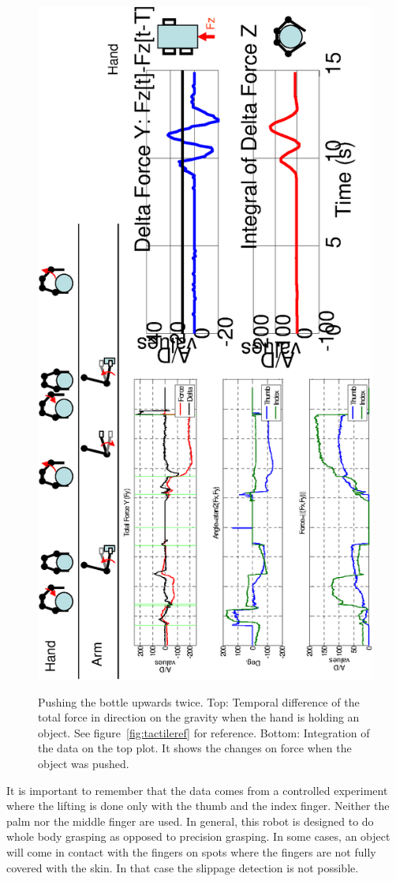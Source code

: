 \begin{figure}[htbp]
\centering
\includegraphics[height=\textwidth, angle=270 ]{./figures/ObTest00.eps}
\label{fig:slipseq}
%
\caption[Pushing the bottle upwards twice]{Pushing the bottle
upwards twice. Top: Temporal difference of the total force in
direction on the gravity when the hand is holding an object. See
figure~\ref{fig:tactileref} for reference. Bottom: Integration of
the data on the top plot. It shows the changes on force when the
object was pushed.}
\end{figure}

It is important to remember that the data comes from a controlled
experiment where the lifting is done only with the thumb and the
index finger. Neither the palm nor the middle finger are used. In
general, this robot is designed to do whole body grasping as
opposed to precision grasping. In some cases, an object will come
in contact with the fingers on spots where the fingers are not
fully covered with the skin. In that case the slippage detection
is not possible.



